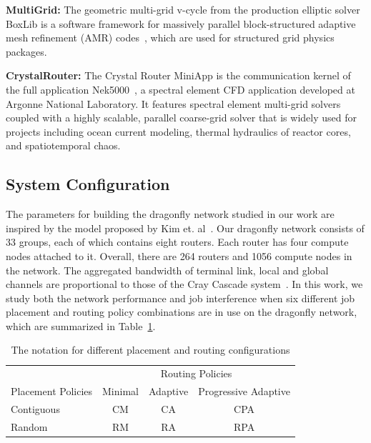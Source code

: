 \documentclass[conference,compsoc]{IEEEtran}
\begin{document}
\textbf{MultiGrid:} The geometric multi-grid v-cycle from the production elliptic solver BoxLib is a software framework for massively parallel block-structured adaptive mesh refinement (AMR) codes~\cite{boxlib}, which are used for structured grid physics packages. 

\textbf{CrystalRouter:} The Crystal Router MiniApp is the communication kernel of the full application Nek5000~\cite{nek5000}, a spectral element CFD application developed at Argonne National Laboratory. It features spectral element multi-grid solvers coupled with a highly scalable, parallel coarse-grid solver that is widely used for projects including ocean current modeling, thermal hydraulics of reactor cores, and spatiotemporal chaos. 




\subsection{System Configuration}
\label{sec: simulation configuration}

The parameters for building the dragonfly network studied in our work are inspired by the model proposed by Kim et. al~\cite{kim-micro}. Our dragonfly network consists of 33 groups, each of which contains eight routers. Each router has four compute nodes attached to it. Overall, there are 264 routers and 1056 compute nodes in the network. The aggregated bandwidth of terminal link,  local and global channels are proportional to those of the Cray Cascade system~\cite{faanes}. In this work, we study both the network performance and job interference when six different job placement and routing policy combinations are in use on the dragonfly network, which are summarized in Table~\ref{tab: placement routing configs}. 


\begin{table}[ht]
\begin{center}
\caption{The notation for different placement and routing configurations} 
\label{tab: placement routing configs}
\begin{tabular}{l c c c }
\toprule %
\toprule
&\multicolumn{3}{c}{Routing Policies} \\ 
\cmidrule(l){2-4}
Placement Policies & Minimal & Adaptive & Progressive Adaptive\\ %
\midrule %
Contiguous  &  CM   &   CA   &  CPA   \\ %
\midrule
Random  &   RM  &   RA   &  RPA   \\ 
\midrule %
\bottomrule %
\end{tabular}
\end{center}
\end{table}
\end{document}

